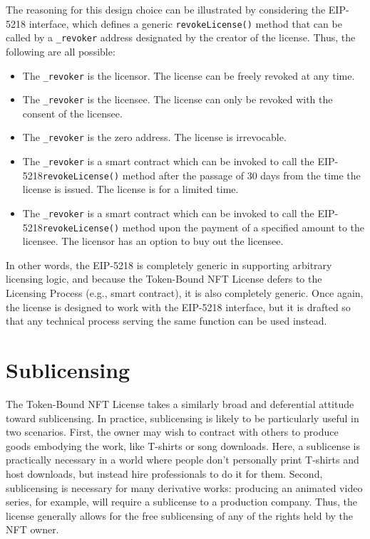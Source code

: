 \documentclass{article}
\newcommand{\eiplicense}{EIP-5218\xspace}
\newcommand{\iccclicense}{Token-Bound NFT License\xspace}
\renewcommand{\code}[1]{\colorbox{light-gray}{\texttt{#1}}}
\begin{document}
The reasoning for this design choice can be illustrated by considering the \eiplicense interface, which defines a generic \code{revokeLicense()} method that can be called by a \code{\_revoker} address designated by the creator of the license. Thus, the following are all possible:
\begin{itemize}
\item The \code{\_revoker} is the licensor. The license can be freely revoked at any time.
\item The \code{\_revoker} is the licensee. The license can only be revoked with the consent of the licensee.
\item The \code{\_revoker} is the zero address. The license is irrevocable.
\item The \code{\_revoker} is a smart contract which can be invoked to call the \eiplicense \code{revokeLicense()} method after the passage of 30 days from the time the license is issued. The license is for a limited time.
\item The \code{\_revoker} is a smart contract which can be invoked to call the \eiplicense \code{revokeLicense()} method upon the payment of a specified amount to the licensee. The licensor has an option to buy out the licensee.
\end{itemize}
In other words, the \eiplicense is completely generic in supporting arbitrary licensing logic, and because the \iccclicense defers to the Licensing Process (e.g., smart contract), it is also completely generic. Once again, the license is designed to work with the \eiplicense interface, but it is drafted so that any technical process serving the same function can be used instead.

\section{Sublicensing}

The \iccclicense takes a similarly broad and deferential attitude toward sublicensing. In practice, sublicensing is likely to be particularly useful in two scenarios. First, the owner may wish to contract with others to produce goods embodying the work, like T-shirts or song downloads. Here, a sublicense is practically necessary in a world where people don't personally print T-shirts and host downloads, but instead hire professionals to do it for them. Second, sublicensing is necessary for many derivative works: producing an animated video series, for example, will require a sublicense to a production company. Thus, the license generally allows for the free sublicensing of any of the rights held by the NFT owner.
\end{document}
